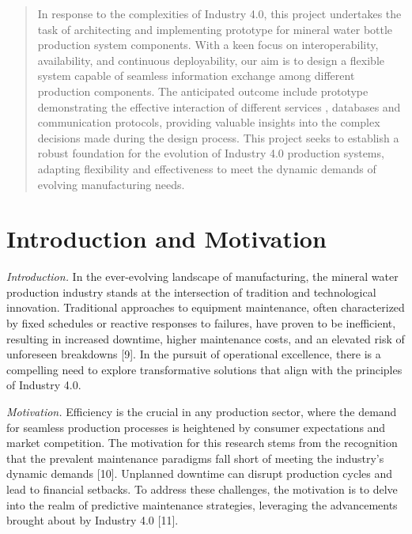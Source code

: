 \documentclass[conference]{IEEEtran}
\begin{document}



\maketitle
\IEEEpubidadjcol
\begin{abstract}
In response to the complexities of Industry 4.0, this project undertakes the task of architecting and implementing prototype for mineral water bottle production system components. With a keen focus on interoperability, availability, and continuous deployability, our aim is to design a flexible system capable of seamless information exchange among different production components.  The anticipated outcome include prototype demonstrating the effective interaction of different services , databases and communication protocols, providing valuable insights into the complex decisions made during the design process. This project  seeks to establish a robust foundation for the evolution of Industry 4.0 production systems, adapting flexibility and effectiveness to meet the dynamic demands of evolving manufacturing needs. 
\end{abstract}

\section{Introduction and Motivation}


\emph{Introduction.}
In the ever-evolving landscape of manufacturing, the mineral water production industry stands at the intersection of tradition and technological innovation. Traditional approaches to equipment maintenance, often characterized by fixed schedules or reactive responses to failures, have proven to be inefficient, resulting in increased downtime, higher maintenance costs, and an elevated risk of unforeseen breakdowns [9]. In the pursuit of operational excellence, there is a compelling need to explore transformative solutions that align with the principles of Industry 4.0.

\emph{Motivation.}
Efficiency is the crucial in any production sector, where the demand for seamless production processes is heightened by consumer expectations and market competition. The motivation for this research stems from the recognition that the prevalent maintenance paradigms fall short of meeting the industry's dynamic demands [10]. Unplanned downtime can disrupt production cycles and lead to financial setbacks. To address these challenges, the motivation is to delve into the realm of predictive maintenance strategies, leveraging the advancements brought about by Industry 4.0 [11].
\end{document}
